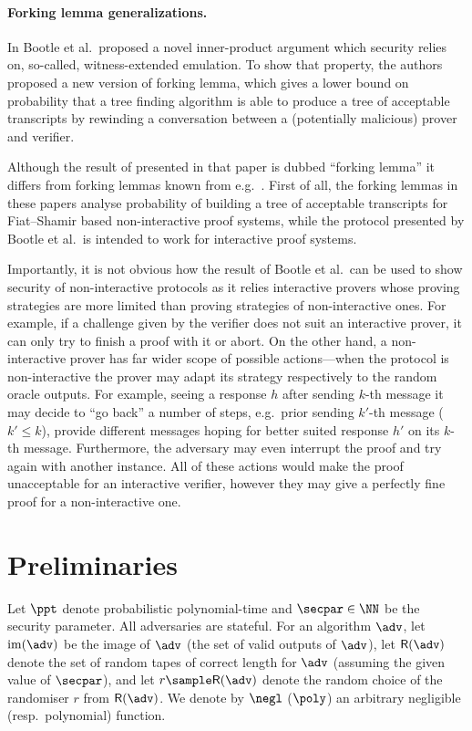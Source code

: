 \documentclass[runningheads,11pt]{llncs}
\theoremstyle{definition} \newtheorem{definition}[theorem]{Definition}
\begin{document}
\paragraph{Forking lemma generalizations.}
In \cite{EC:BCCGP16} Bootle et al.~proposed a novel inner-product argument which
security relies on, so-called, witness-extended emulation. To show that
property, the authors proposed a new version of forking lemma, which gives a
lower bound on probability that a tree finding algorithm is able to produce a 
tree of acceptable transcripts by rewinding a conversation between a
(potentially malicious) prover and verifier.

Although the result of presented in that paper is dubbed ``forking lemma'' it
differs from forking lemmas known from e.g.~\cite{JC:PoiSte00,CCS:BelNev06}.
First of all, the forking lemmas in these papers analyse probability of building
a tree of acceptable transcripts for Fiat--Shamir based non-interactive proof
systems, while the protocol presented by Bootle et al.~is intended to work for
interactive proof systems.

Importantly, it is not obvious how the result of Bootle et al.~can be used to
show security of non-interactive protocols as it relies interactive provers
whose proving strategies are more limited than proving strategies of
non-interactive ones. For example, if a challenge given by the verifier does not
suit an interactive prover, it can only try to finish a proof with it or
abort. On the other hand, a non-interactive prover has far wider scope of
possible actions---when the protocol is non-interactive the prover may
adapt its strategy respectively to the random oracle outputs. For example,
seeing a response $h$ after sending $k$-th message it may decide to ``go back''
a number of steps, e.g.~prior sending $k'$-th message ($k' \leq k$), provide
different messages hoping for better suited response $h'$ on its $k$-th
message. Furthermore, the adversary may even interrupt the proof and try again
with another instance. All of these actions would make the proof unacceptable
for an interactive verifier, however they may give a perfectly fine proof for a
non-interactive one.

\section{Preliminaries}
\label{sec:preliminaries}
Let $\ppt$ denote probabilistic polynomial-time and $\secpar \in \NN$ be the
security parameter. All adversaries are stateful. For an algorithm $\adv$, let
$\image (\adv)$ be the image of $\adv$ (the set of valid outputs of $\adv$), let
$\RND{\adv}$ denote the set of random tapes of correct length for $\adv$
(assuming the given value of $\secpar$), and let $r \sample \RND{\adv}$ denote
the random choice of the randomiser $r$ from $\RND{\adv}$. We denote by $\negl$
($\poly$) an arbitrary negligible (resp.~polynomial) function.
\end{document}
